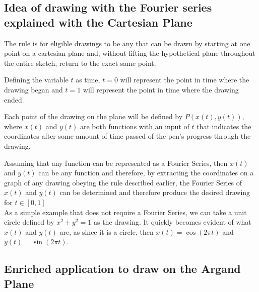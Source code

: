 \documentclass[letterpaper, 12pt]{article}
\begin{document}


\subsection{Idea of drawing with the Fourier series explained with the Cartesian Plane}

The rule is for eligible drawings to be any that can be drawn by starting at one point
on a cartesian plane and, without lifting the hypothetical plane throughout the entire
sketch, return to the exact same point.

Defining the variable \(t\) as time, \(t = 0\) will represent the point in time
where the drawing began and \(t = 1\) will represent the point in time where
the drawing ended.

Each point of the drawing on the plane will be defined by \(P(x(t), y(t))\),
where \(x(t)\) and \(y(t)\) are both functions with an input of \(t\) that
indicates the coordinates after some amount of time passed of the pen's progress
through the drawing.

Assuming that any function can be represented as a Fourier Series, then
\(x(t)\) and \(y(t)\) can be any function and therefore, by extracting
the coordinates on a graph of any drawing obeying the rule described earlier,
the Fourier Series of \(x(t)\) and \(y(t)\) can be determined and therefore
produce the desired drawing for \(t\in [0,1]\)
\\

As a simple example that does not require a Fourier Series,
we can take a unit circle defined by \( x^2 + y^2 = 1 \) as the drawing.
It quickly becomes evident of what \(x(t)\) and \(y(t)\) are, as since it is a circle,
then \(x(t) = \cos(2\pi t)\) and \(y(t) = \sin(2\pi t)\).

\subsection{Enriched application to draw on the Argand Plane}
\end{document}
